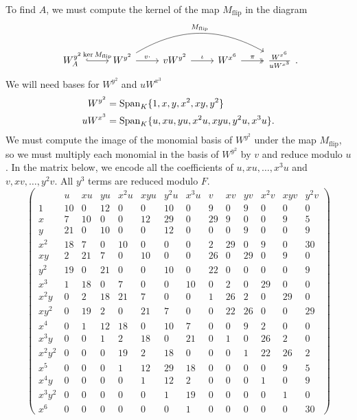 To find $A$, we must compute the kernel of the map $M_{\text{flip}}$ in the diagram
\[ \begin{tikzcd}
  W_A^{y^2} \arrow[hook]{r}{\ker M_{\text{flip}}} &
  W^{y^2} \arrow{r}{v \cdot} \arrow[bend left]{rrr}{M_{\text{flip}}} &
  vW^{y^2} \arrow{r}{\iota} &
  W^{x^6} \arrow[two heads]{r}{\pi} &
  \frac {W^{x^6}} {uW^{x^3}}
\end{tikzcd}. \]
We will need bases for $W^{y^2}$ and $uW^{x^3}$
\begin{align*}
  W^{y^2} &= \operatorname{Span}_K\{ 1, x, y, x^2, xy, y^2 \} \\
  uW^{x^3} &= \operatorname{Span}_K\{ u, xu, yu, x^2u, xyu, y^2u, x^3u \}.
\end{align*}
We must compute the image of the monomial basis of $W^{y^2}$ under the map $M_{\text{flip}}$,
so we must multiply each monomial in the basis of $W^{y^2}$ by $v$ and reduce modulo $u$.
In the matrix below, we encode all the coefficients of $u, xu, \ldots, x^3u$ and $v, xv, \ldots, y^2v$.
All $y^3$ terms are reduced modulo $F$.
\[ \left( \begin{array}{r|rrrrrrr|rrrrrr}
         & u & xu & yu & x^2u & xyu & y^2u & x^3u & v & xv & yv & x^2v & xyv & y^2v \\
  \hline
     1 & 10 &  0 & 12 &  0 &  0 & 10 &  0 &  9 &  0 &  9 &  0 &  0 &  0 \\
     x &  7 & 10 &  0 &  0 & 12 & 29 &  0 & 29 &  9 &  0 &  0 &  9 &  5 \\
     y & 21 &  0 & 10 &  0 &  0 & 12 &  0 &  0 &  0 &  9 &  0 &  0 &  9 \\
   x^2 & 18 &  7 &  0 & 10 &  0 &  0 &  0 &  2 & 29 &  0 &  9 &  0 & 30 \\
    xy &  2 & 21 &  7 &  0 & 10 &  0 &  0 & 26 &  0 & 29 &  0 &  9 &  0 \\
   y^2 & 19 &  0 & 21 &  0 &  0 & 10 &  0 & 22 &  0 &  0 &  0 &  0 &  9 \\
   x^3 &  1 & 18 &  0 &  7 &  0 &  0 & 10 &  0 &  2 &  0 & 29 &  0 &  0 \\
  x^2y &  0 &  2 & 18 & 21 &  7 &  0 &  0 &  1 & 26 &  2 &  0 & 29 &  0 \\
  xy^2 &  0 & 19 &  2 &  0 & 21 &  7 &  0 &  0 & 22 & 26 &  0 &  0 & 29 \\
   x^4 &  0 &  1 & 12 & 18 &  0 & 10 &  7 &  0 &  0 &  9 &  2 &  0 &  0 \\
  x^3y &  0 &  0 &  1 &  2 & 18 &  0 & 21 &  0 &  1 &  0 & 26 &  2 &  0 \\
x^2y^2 &  0 &  0 &  0 & 19 &  2 & 18 &  0 &  0 &  0 &  1 & 22 & 26 &  2 \\
   x^5 &  0 &  0 &  0 &  1 & 12 & 29 & 18 &  0 &  0 &  0 &  0 &  9 &  5 \\
  x^4y &  0 &  0 &  0 &  0 &  1 & 12 &  2 &  0 &  0 &  0 &  1 &  0 &  9 \\
x^3y^2 &  0 &  0 &  0 &  0 &  0 &  1 & 19 &  0 &  0 &  0 &  0 &  1 &  0 \\
   x^6 &  0 &  0 &  0 &  0 &  0 &  0 &  1 &  0 &  0 &  0 &  0 &  0 & 30
\end{array} \right) \]

